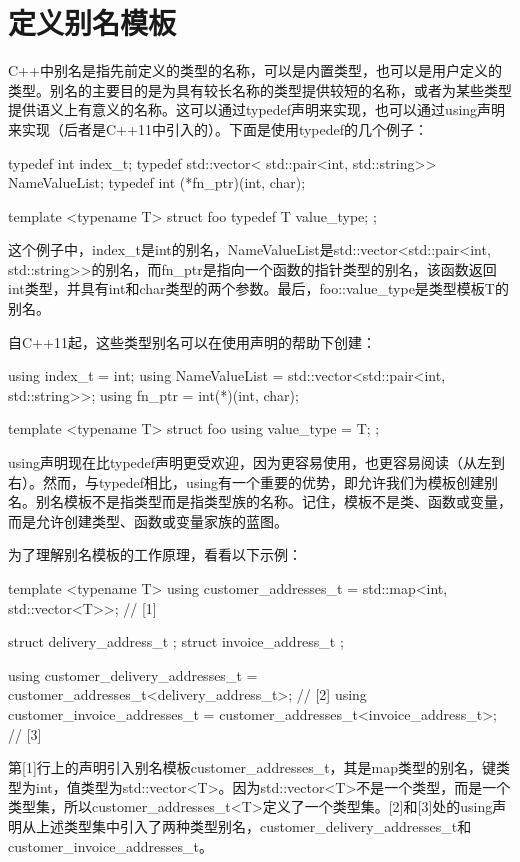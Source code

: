 \section{定义别名模板}
C++中别名是指先前定义的类型的名称，可以是内置类型，也可以是用户定义的类型。别名的主要目的是为具有较长名称的类型提供较短的名称，或者为某些类型提供语义上有意义的名称。这可以通过typedef声明来实现，也可以通过using声明来实现（后者是C++11中引入的）。下面是使用typedef的几个例子：

\begin{cppcode}
typedef int index_t;
typedef std::vector<
			std::pair<int, std::string>> NameValueList;
typedef int (*fn_ptr)(int, char);

template <typename T>
struct foo
{
	typedef T value_type;
};
\end{cppcode}

这个例子中，index_t是int的别名，NameValueList是std::vector<std::pair<int, std::string>>的别名，而fn_ptr是指向一个函数的指针类型的别名，该函数返回int类型，并具有int和char类型的两个参数。最后，foo::value_type是类型模板T的别名。

自C++11起，这些类型别名可以在使用声明的帮助下创建：

\begin{cppcode}
using index_t = int;
using NameValueList =
	std::vector<std::pair<int, std::string>>;
using fn_ptr = int(*)(int, char);

template <typename T>
struct foo
{
	using value_type = T;
};
\end{cppcode}

using声明现在比typedef声明更受欢迎，因为更容易使用，也更容易阅读（从左到右）。然而，与typedef相比，using有一个重要的优势，即允许我们为模板创建别名。别名模板不是指类型而是指类型族的名称。记住，模板不是类、函数或变量，而是允许创建类型、函数或变量家族的蓝图。

为了理解别名模板的工作原理，看看以下示例：

\begin{cppcode}
template <typename T>
using customer_addresses_t =
	std::map<int, std::vector<T>>; // [1]
	
struct delivery_address_t {};
struct invoice_address_t {};

using customer_delivery_addresses_t =
	customer_addresses_t<delivery_address_t>; // [2]
using customer_invoice_addresses_t =
	customer_addresses_t<invoice_address_t>; // [3]
\end{cppcode}

第[1]行上的声明引入别名模板customer_addresses_t，其是map类型的别名，键类型为int，值类型为std::vector<T>。因为std::vector<T>不是一个类型，而是一个类型集，所以customer_addresses_t<T>定义了一个类型集。[2]和[3]处的using声明从上述类型集中引入了两种类型别名，customer_delivery_addresses_t和customer_invoice_addresses_t。


